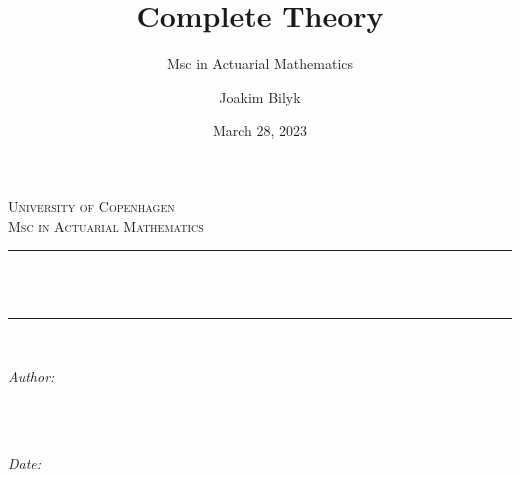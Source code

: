 \documentclass[
]{book}
\title{Complete Theory}
\subtitle{Msc in Actuarial Mathematics}
\author{Joakim Bilyk}
\date{March 28, 2023}
\begin{document}


{
\begin{titlepage}
\newcommand{\HRule}{\rule{\linewidth}{0.5mm}} %

\center %
 

\textsc{\LARGE University of Copenhagen}\\[4cm] %
\textsc{\Large Msc in Actuarial Mathematics}\\[0.5cm] %


\HRule \\[0.4cm]
{ \huge \bfseries \thetitle}\\[0.4cm] %
\HRule \\[1.5cm]
 

\begin{minipage}{0.4\textwidth}
\begin{flushleft} \large
\emph{Author:}\\
\textsc{\theauthor} \\
\end{flushleft}
\end{minipage}
~
\begin{minipage}{0.4\textwidth}
\begin{flushright} \large
\emph{Date:} \\
\textsc{\thedate} \\
\end{flushright}
\end{minipage}\\[2cm]


\end{titlepage}}
\end{document}
